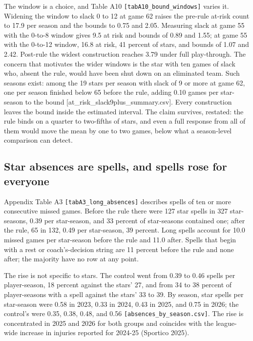 \documentclass[11pt]{article}
\begin{document}
The window is a choice, and Table A10 {\small\texttt{[tabA10\_bound\_windows]}} varies it. Widening the window to slack 0 to 12 at game 62 raises the pre-rule at-risk count to 17.9 per season and the bounds to 0.75 and 2.05. Measuring slack at game 55 with the 0-to-8 window gives 9.5 at risk and bounds of 0.89 and 1.55; at game 55 with the 0-to-12 window, 16.8 at risk, 41 percent of stars, and bounds of 1.07 and 2.42. Post-rule the widest construction reaches 3.79 under full play-through. The concern that motivates the wider windows is the star with ten games of slack who, absent the rule, would have been shut down on an eliminated team. Such seasons exist: among the 19 stars per season with slack of 9 or more at game 62, one per season finished below 65 before the rule, adding 0.10 games per star-season to the bound [at\_risk\_slack9plus\_summary.csv]. Every construction leaves the bound inside the estimated interval. The claim survives, restated: the rule binds on a quarter to two-fifths of stars, and even a full response from all of them would move the mean by one to two games, below what a season-level comparison can detect.


\subsection*{Star absences are spells, and spells rose for everyone}


Appendix Table A3 {\small\texttt{[tabA3\_long\_absences]}} describes spells of ten or more consecutive missed games. Before the rule there were 127 star spells in 327 star-seasons, 0.39 per star-season, and 33 percent of star-seasons contained one; after the rule, 65 in 132, 0.49 per star-season, 39 percent. Long spells account for 10.0 missed games per star-season before the rule and 11.0 after. Spells that begin with a rest or coach's-decision string are 11 percent before the rule and none after; the majority have no row at any point.

The rise is not specific to stars. The control went from 0.39 to 0.46 spells per player-season, 18 percent against the stars' 27, and from 34 to 38 percent of player-seasons with a spell against the stars' 33 to 39. By season, star spells per star-season were 0.58 in 2023, 0.33 in 2024, 0.43 in 2025, and 0.75 in 2026; the control's were 0.35, 0.38, 0.48, and 0.56 {\small\texttt{[absences\_by\_season.csv]}}. The rise is concentrated in 2025 and 2026 for both groups and coincides with the league-wide increase in injuries reported for 2024-25 (Sportico 2025).
\end{document}
